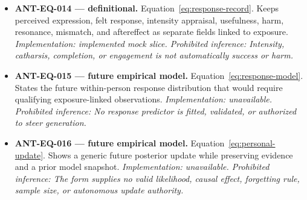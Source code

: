 \begin{itemize}[leftmargin=1.35em,itemsep=0.72em]
  \textit{Implementation: unavailable. Prohibited inference: A crossfade cannot repair incompatible rhythm, harmony, phrase, timbre, meaning, or emotional pacing.}
  \item \textbf{ANT-EQ-014 --- definitional.} Equation~\ref{eq:response-record}. Keeps perceived expression, felt response, intensity appraisal, usefulness, harm, resonance, mismatch, and aftereffect as separate fields linked to exposure.
  \textit{Implementation: implemented mock slice. Prohibited inference: Intensity, catharsis, completion, or engagement is not automatically success or harm.}
  \item \textbf{ANT-EQ-015 --- future empirical model.} Equation~\ref{eq:response-model}. States the future within-person response distribution that would require qualifying exposure-linked observations.
  \textit{Implementation: unavailable. Prohibited inference: No response predictor is fitted, validated, or authorized to steer generation.}
  \item \textbf{ANT-EQ-016 --- future empirical model.} Equation~\ref{eq:personal-update}. Shows a generic future posterior update while preserving evidence and a prior model snapshot.
  \textit{Implementation: unavailable. Prohibited inference: The form supplies no valid likelihood, causal effect, forgetting rule, sample size, or autonomous update authority.}
\end{itemize}
